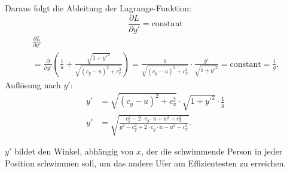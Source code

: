 Daraus folgt die Ableitung der Lagrange-Funktion:
\begin{equation}\label{eq:Lagrange_derivites_1}
    \frac{\partial L}{\partial y'} = \text{constant}
\end{equation}
\begin{multline}\label{eq:Lagrange_derivites_2}
    \frac{\partial L}{\partial y'} \\
    = \frac{\partial}{\partial y'} \left( \frac{1}{u} + \frac{\sqrt{1 + y'^2}}{\sqrt{(c_y - u)^2 + c_x^2}} \right) 
    = \frac{1}{\sqrt{(c_y - u)^2 + c_x^2}} \cdot \frac{y'}{\sqrt{1 + y'^2}} = \text{constant} = \frac{1}{g}.
\end{multline}
Auflösung nach \(y'\):
\begin{align}
    y' &= \sqrt{(c_y - u)^2 + c_x^2} \cdot \sqrt{1 + y'^2} \cdot \frac{1}{g} \\
    y' &= \sqrt{\frac{c_y^2 - 2 \cdot c_y \cdot u + u^2 + c_x^2}{g^2 - c_y^2 + 2 \cdot c_y \cdot u - u^2 - c_x^2}}.\label{eq:angle}
\end{align}

\(y'\) bildet den Winkel, abhängig von \(x\), der die schwimmende Person in jeder Position schwimmen soll, um das andere Ufer am Effizientesten zu erreichen.





















        



